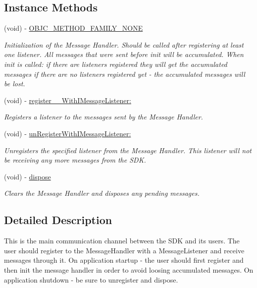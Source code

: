 \subsection*{Instance Methods}
\begin{DoxyCompactItemize}
\item 
(void) -\/ \hyperlink{protocol_i_message_handler-p_a3b2f6a1d4f6d16197a58e76a94e1485b}{O\+B\+J\+C\+\_\+\+M\+E\+T\+H\+O\+D\+\_\+\+F\+A\+M\+I\+L\+Y\+\_\+\+N\+O\+N\+E}
\begin{DoxyCompactList}\small\item\em Initialization of the Message Handler. Should be called after registering at least one listener. All messages that were sent before init will be accumulated. When init is called\+: if there are listeners registered they will get the accumulated messages if there are no listeners registered yet -\/ the accumulated messages will be lost. \end{DoxyCompactList}\item 
(void) -\/ \hyperlink{protocol_i_message_handler-p_aa363cefc2f80a6df3087e3649677bdee}{register\+\_\+\+\_\+\+With\+I\+Message\+Listener\+:}
\begin{DoxyCompactList}\small\item\em Registers a listener to the messages sent by the Message Handler. \end{DoxyCompactList}\item 
(void) -\/ \hyperlink{protocol_i_message_handler-p_a6814f6df65cd44f52adbf26681e4009e}{un\+Register\+With\+I\+Message\+Listener\+:}
\begin{DoxyCompactList}\small\item\em Unregisters the specified listener from the Message Handler. This listener will not be receiving any more messages from the S\+D\+K. \end{DoxyCompactList}\item 
(void) -\/ \hyperlink{protocol_i_message_handler-p_a13302c09dd995dfb944f4f73dcfb7581}{dispose}
\begin{DoxyCompactList}\small\item\em Clears the Message Handler and disposes any pending messages. \end{DoxyCompactList}\end{DoxyCompactItemize}


\subsection{Detailed Description}
This is the main communication channel between the S\+D\+K and its users. The user should register to the Message\+Handler with a Message\+Listener and receive messages through it. On application startup -\/ the user should first register and then init the message handler in order to avoid loosing accumulated messages. On application shutdown -\/ be sure to unregister and dispose. 


